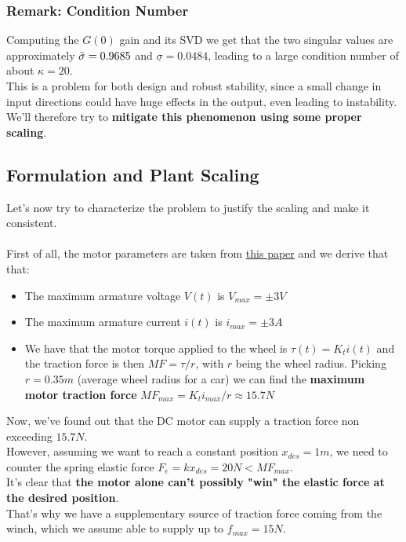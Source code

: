 \documentclass[a4paper, 12pt]{article}
\begin{document}
\subsubsection{Remark: Condition Number}
Computing the $G(0)$ gain and its SVD we get that the two singular values are approximately $\Bar{\sigma} = 0.9685$ and $\underline{\sigma} = 0.0484$, leading to a large condition number of about $\kappa = 20$.
\\ This is a problem for both design and robust stability, since a small change in input directions could have huge effects in the output, even leading to instability. We'll therefore try to \textbf{mitigate this phenomenon using some proper scaling}.
\subsection{Formulation and Plant Scaling}
Let's now try to characterize the problem to justify the scaling and make it consistent.\\
\\First of all, the motor parameters are taken from \hyperlink{https://www.researchgate.net/publication/272102820_Parameters_Identification_of_a_Permanent_Magnet_DC_Motor}{this paper} and we derive that that:
\begin{itemize}
    \item The maximum armature voltage $V(t)$ is $V_{max} = \pm 3 V$
    \item The maximum armature current $i(t)$ is $i_{max} = \pm 3A$
    \item We have that the motor torque applied to the wheel is $\tau(t) = K_t i(t)$ and the traction force is then $MF = \tau / r$, with $r$ being the wheel radius. Picking $r = 0.35m$ (average wheel radius for a car) we can find the \textbf{maximum motor traction force} $MF_{max} = K_t i_{max} / r \approx 15.7 N$ 
\end{itemize}
Now, we've found out that the DC motor can supply a traction force non exceeding $15.7 N$.\\ However, assuming we want to reach a constant position $x_{des} = 1m$, we need to counter the spring elastic force $F_e = k x_{des} = 20N < MF_{max}$. \\It's clear that \textbf{the motor alone can't possibly "win" the elastic force at the desired position}.\\
That's why we have a supplementary source of traction force coming from the winch, which we assume able to supply up to $f_{max} = 15N$.
\\\\
\end{document}
